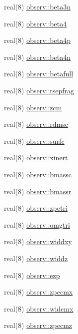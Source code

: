 \begin{DoxyCompactItemize}
real(8) \hyperlink{namespaceobserv_af0eb489826da64a5a3eff551c79d7eb0}{observ\+::beta3n}
\item 
real(8) \hyperlink{namespaceobserv_a47b1c6dbefba99b8eeeeb876d0cb626e}{observ\+::beta4}
\item 
real(8) \hyperlink{namespaceobserv_a60ae9f4bd6411b61020690536d5d0c9d}{observ\+::beta4p}
\item 
real(8) \hyperlink{namespaceobserv_a71725cf0728a327f5bc7585186708af7}{observ\+::beta4n}
\item 
real(8) \hyperlink{namespaceobserv_a83b0ac43dc656fabd27cb889e02496bc}{observ\+::betafull}
\item 
real(8) \hyperlink{namespaceobserv_a54e2e97adacbf83b5bbd1d6836ae5a9e}{observ\+::rsepfrag}
\item 
real(8) \hyperlink{namespaceobserv_a70ecabcf15034808b4bb9500d3826a79}{observ\+::zcm}
\item 
real(8) \hyperlink{namespaceobserv_a3d24e28b38a8f944e6e335697a5819de}{observ\+::rdmsc}
\item 
real(8) \hyperlink{namespaceobserv_a0c3e68d8ecea5ff3171ecea1551e1bb1}{observ\+::surfc}
\item 
real(8) \hyperlink{namespaceobserv_a6687188e31bb4225d4f5f5406f282302}{observ\+::xinert}
\item 
real(8) \hyperlink{namespaceobserv_a11476aea6a4dfc6718d071f1408a32b5}{observ\+::bmassc}
\item 
real(8) \hyperlink{namespaceobserv_a695c136a636f71d44a9dcff1c045f506}{observ\+::bmassr}
\item 
real(8) \hyperlink{namespaceobserv_a1edc329ee9e9a9e175b95c7537407759}{observ\+::zpetri}
\item 
real(8) \hyperlink{namespaceobserv_a173bfde5e0842795adefaf2aec38fb68}{observ\+::omgtri}
\item 
real(8) \hyperlink{namespaceobserv_aa975d7d153f748785eb30f5494f2ad80}{observ\+::widdxy}
\item 
real(8) \hyperlink{namespaceobserv_af8caa2b5090bb5b80d0299822bb858e0}{observ\+::widdz}
\item 
real(8) \hyperlink{namespaceobserv_a0de483117299fa6f8284416a0706a75e}{observ\+::ezp}
\item 
real(8) \hyperlink{namespaceobserv_a25dc1a401a0a58fe28e5d78fa6ec4cb0}{observ\+::zpecmx}
\item 
real(8) \hyperlink{namespaceobserv_a01479360bb624e189a7f72acb2eb2f0d}{observ\+::widcmx}
\item 
real(8) \hyperlink{namespaceobserv_a6343c5bd2b3a06e7c47357ce13c5620e}{observ\+::zpecmz}

\end{DoxyCompactItemize}

